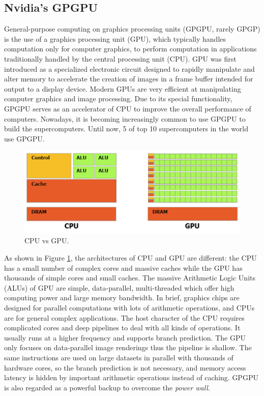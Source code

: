 \subsection{Nvidia's GPGPU}

General-purpose computing on graphics processing units (GPGPU, rarely GPGP) is the use of a graphics processing unit (GPU), which typically handles computation only for computer graphics, to perform computation in applications traditionally handled by the central processing unit (CPU). GPU was first introduced as a specialized electronic circuit designed to rapidly manipulate and alter memory to accelerate the creation of images in a frame buffer intended for output to a display device. Modern GPUs are very efficient at manipulating computer graphics and image processing. Due to its special functionality, GPGPU serves as an accelerator of CPU to improve the overall performance of computers. Nowadays, it is becoming increasingly common to use GPGPU to build the supercomputers. Until now, 5 of top 10 supercomputers in the world use GPGPU.

\begin{figure}[htbp]
	\centering
	\includegraphics[width=6.in]{fig/cpu_vs_gpu.png}
	\caption{CPU vs GPU.}
	\label{cpuvsgpu}
\end{figure}

As shown in Figure \ref{cpuvsgpu}, the architectures of CPU and GPU are different: the CPU has a small number of complex cores and massive caches while the GPU has thousands of simple cores and small caches. The massive Arithmetic Logic Units (ALUs) of GPU are simple, data-parallel, multi-threaded which offer high computing power and large memory bandwidth. In brief, graphics chips are designed for parallel computations with lots of arithmetic operations, and CPUs are for general complex applications. The host character of the CPU requires complicated cores and deep pipelines to deal with all kinds of operations. It usually runs at a higher frequency and supports branch prediction. The GPU only focuses on data-parallel image renderings thus the pipeline is shallow. The same instructions are used on large datasets in parallel with thousands of hardware cores, so the branch prediction is not necessary, and memory access latency is hidden by important arithmetic operations instead of caching. GPGPU is also regarded as a powerful backup to overcome the \textit{power wall}.

